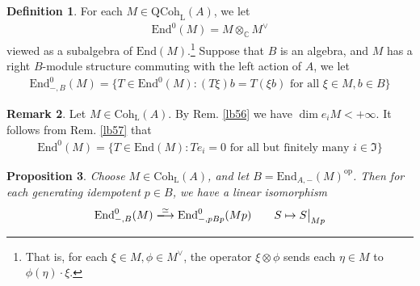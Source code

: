 \documentclass[11pt,b5paper,notitlepage]{article}
\theoremstyle{definition}
\newtheorem{df}{Definition}[section]
\newtheorem{rem}[df]{Remark}
\theoremstyle{plain}
\newtheorem{pp}[df]{Proposition}
\newcommand{\fk}{\mathfrak}
\newcommand{\End}{\mathrm{End}} %
\newcommand{\opp}{\mathrm{op}}
\newcommand{\Cbb}{\mathbb C}
\newcommand{\QC}{\mathrm{QCoh}_{\mathrm L}}
\newcommand{\Coh}{\mathrm{Coh}_{\mathrm L}}
\numberwithin{equation}{section}
\begin{document}
\begin{df}
For each $M\in\QC(A)$, we let
\begin{align*}
\End^0(M)=M\otimes_\Cbb M^\vee
\end{align*}
viewed as a subalgebra of $\End(M)$.\footnote{That is, for each $\xi\in M,\phi\in M^\vee$, the operator $\xi\otimes\phi$ sends each $\eta\in M$ to $\phi(\eta)\cdot\xi$.} Suppose that $B$ is an algebra, and $M$ has a right $B$-module structure commuting with the left action of $A$, we let
\begin{align}
\End^0_{-,B}(M)=\{T\in\End^0(M):(T\xi)b=T(\xi b)\text{ for all }\xi\in M,b\in B\}
\end{align}
\end{df}


\begin{rem}\label{lb58}
Let $M\in\Coh(A)$. By Rem. \ref{lb56} we have $\dim e_iM<+\infty$. It follows from Rem. \ref{lb57} that
\begin{align*}
\End^0(M)=\{T\in\End(M):Te_i=0\text{ for all but finitely many }i\in\fk I\}
\end{align*}
\end{rem}


\begin{pp}\label{lb51}
Choose $M\in \Coh(A)$, and let $B=\End_{A,-}(M)^\opp$. Then for each generating idempotent $p\in B$, we have a linear isomorphism
\begin{gather}\label{eq11}
\begin{gathered}
	\End_{-,B}^0(M)\xlongrightarrow{\simeq} \End_{-,pBp}^0(Mp)\qquad S\mapsto S\big|_{Mp}
\end{gathered}
\end{gather}
\end{pp}
\end{document}
